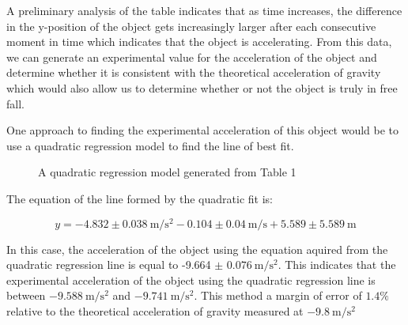\documentclass[12pt]{article}
\begin{document}
A preliminary analysis of the table indicates that as time increases, the difference in the y-position of the object gets increasingly larger after each consecutive moment in time which indicates that the object is accelerating. From this data, we can generate an experimental value for the acceleration of the object and determine whether it is consistent with the theoretical acceleration of gravity which would also allow us to determine whether or not the object is truly in free fall.

One approach to finding the experimental acceleration of this object would be to use a quadratic regression model to find the line of best fit.

\begin{figure}[H]
    \centering

    \caption[10pt]{A quadratic regression model generated from Table 1}


\end{figure}
The equation of the line formed by the quadratic fit is:

\[ y=-4.832 \pm \SI{0.038}{\metre\per\second\squared}-0.104 \pm \SI{0.04}{\metre\per\second}+5.589 \pm \SI{5.589}{\metre}\]

In this case, the acceleration of the object using the equation aquired from the quadratic regression line is equal to -9.664 $\pm$ $\SI{0.076}{\metre\per\second\squared}$. This indicates that the experimental acceleration of the object using the quadratic regression line is between $\SI{-9.588}{\metre\per\second\squared}$ and $\SI{-9.741}{\metre\per\second\squared}$. This method a margin of error of $1.4\%$ relative to the theoretical acceleration of gravity measured at $\SI{-9.8}{\metre\per\second\squared}$
\end{document}
